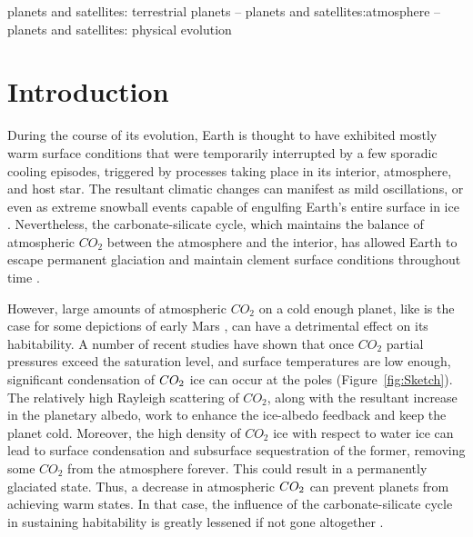 \documentclass[fleqn,usenatbib]{mnras}
\begin{document}
\begin{keywords}
planets and satellites: terrestrial planets -- planets and satellites:atmosphere -- planets and satellites: physical evolution
\end{keywords}



\section{Introduction}

During the course of its evolution, Earth is thought to have exhibited mostly warm surface conditions that were temporarily interrupted by a few sporadic cooling episodes, triggered by processes taking place in its interior, atmosphere, and host star. The resultant climatic changes can manifest as mild oscillations, or even as extreme snowball events capable of engulfing Earth's entire surface in ice \citep{kirschvink1992,Hoffman1342}. Nevertheless, the carbonate-silicate cycle, which maintains the balance of atmospheric $CO_{\mathrm{2}}$ between the atmosphere and the interior, has allowed Earth to escape permanent glaciation and maintain clement surface conditions throughout time \citep{Hoffman1342}.

However, large amounts of atmospheric $CO_{\mathrm{2}}$ on a cold enough planet, like is the case for some depictions of early Mars \citep{Kasting1991,wordsworth2013}, can have a detrimental effect on its habitability. A number of recent studies \citep{Kasting1991,Phumbert2005,Phumbert2011, forget2013,Soto2015, Turbet2017,kadoya_outer_2019} have shown that once $CO_{\mathrm{2}}$ partial pressures exceed the saturation level, and surface temperatures are low enough, significant condensation of $CO_{\rm 2}$ ice can occur at the poles (Figure~\ref{fig:Sketch}). The relatively high Rayleigh scattering of $CO_{\mathrm{2}}$, along with the resultant increase in the planetary albedo, work to enhance the ice-albedo feedback \citep{Kasting1991} and keep the planet cold. Moreover, the high density of $CO_{\mathrm{2}}$ ice with respect to water ice can lead to surface condensation and subsurface sequestration of the former, removing some $CO_{\mathrm{2}}$ from the atmosphere forever. This could result in a permanently glaciated state. Thus, a decrease in atmospheric $CO_{\rm 2}$  can prevent planets from achieving warm states. In that case,  the influence of the carbonate-silicate cycle in sustaining habitability is greatly lessened if not gone altogether \citep{Turbet2017}.  
\end{document}
